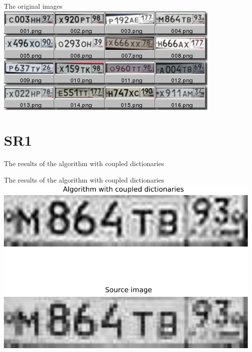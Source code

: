 %
%
%

\begin{frame}{The original images}
  \includegraphics[width=\columnwidth]{content/out_sr1.png}
\end{frame}

\section{SR1}
\begin{frame}{The results of the algorithm with coupled dictionaries}
  
\end{frame}

\begin{frame}{The results of the algorithm with coupled dictionaries}
  \includegraphics[width=\columnwidth]{content/compare_result_sr1_en.pdf}
\end{frame}


